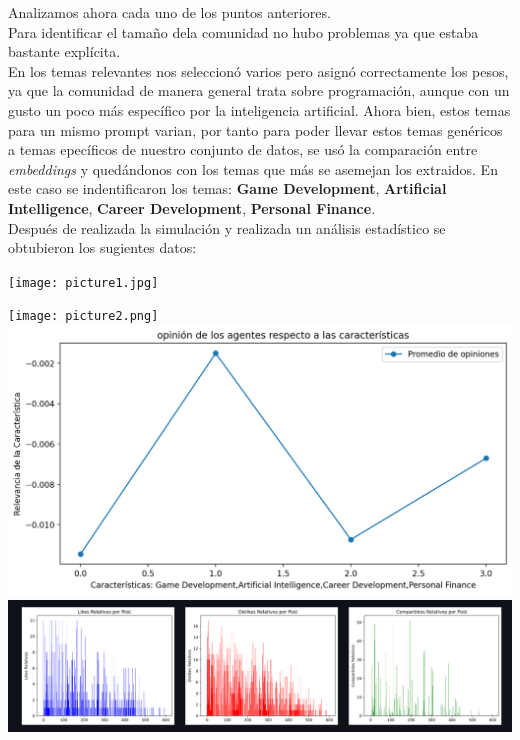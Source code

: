 \documentclass[acmtog]{acmart}
\begin{document}
Analizamos ahora cada uno de los puntos anteriores. 
\\
Para identificar el tamaño dela comunidad no  hubo problemas ya que estaba bastante explícita.
\\
En los temas relevantes nos seleccionó varios pero asignó correctamente los pesos, ya que la comunidad de manera general trata sobre programación, aunque con un gusto un poco más específico por la inteligencia artificial. 
Ahora bien, estos temas para un mismo prompt varian, por tanto para poder llevar estos temas genéricos a temas epecíficos de nuestro conjunto de datos, se usó la comparación entre \textit{embeddings} y quedándonos con los temas que más
se asemejan los extraidos. En este caso se indentificaron los temas: \textbf{Game Development}, \textbf{Artificial Intelligence}, \textbf{Career Development}, \textbf{Personal Finance}.
\\
Después de realizada la simulación y realizada un análisis estadístico se obtubieron los sugientes datos:

\texttt{[image: picture1.jpg]}
\centering
\vspace{0.5cm}

\texttt{[image: picture2.png]}
\vspace{0.5cm}
\includegraphics[scale=0.17]{an_1-agents-opinionts.png}
\vspace{0.5cm}
\includegraphics[scale=0.25]{an_1-lds.png}
\end{document}
